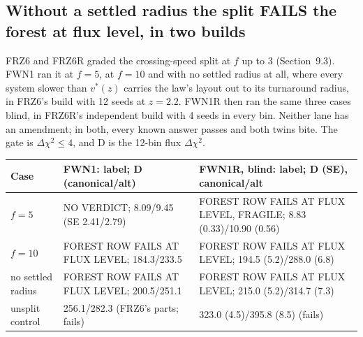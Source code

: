 \documentclass[10pt]{article}
\begin{document}
\subsection{Without a settled radius the split FAILS the forest at flux level, in two builds}
FRZ6 and FRZ6R graded the crossing-speed split at $f$ up to 3 (Section~9.3). FWN1 ran it at $f=5$, at $f=10$ and with no settled radius at all, where every system slower than $v^*(z)$ carries the law's layout out to its turnaround radius, in FRZ6's build with 12 seeds at $z=2.2$. FWN1R then ran the same three cases blind, in FRZ6R's independent build with 4 seeds in every bin. Neither lane has an amendment; in both, every known answer passes and both twins bite. The gate is $\Delta\chi^2\le4$, and D is the 12-bin flux $\Delta\chi^2$.
{\small
\begin{longtable}{@{}p{2.6cm}p{6.2cm}p{6.6cm}@{}}\toprule
Case & FWN1: label; D (canonical/alt) & FWN1R, blind: label; D (SE), canonical/alt\\\midrule\endhead
$f=5$ & NO VERDICT; 8.09/9.45 (SE 2.41/2.79) & FOREST ROW FAILS AT FLUX LEVEL, FRAGILE; 8.83 (0.33)/10.90 (0.56)\\
$f=10$ & FOREST ROW FAILS AT FLUX LEVEL; 184.3/233.5 & FOREST ROW FAILS AT FLUX LEVEL; 194.5 (5.2)/288.0 (6.8)\\
no settled radius & FOREST ROW FAILS AT FLUX LEVEL; 200.5/251.1 & FOREST ROW FAILS AT FLUX LEVEL; 215.0 (5.2)/314.7 (7.3)\\
unsplit control & 256.1/282.3 (FRZ6's parts; fails) & 323.0 (4.5)/395.8 (8.5) (fails)\\\bottomrule
\end{longtable}}
\end{document}
